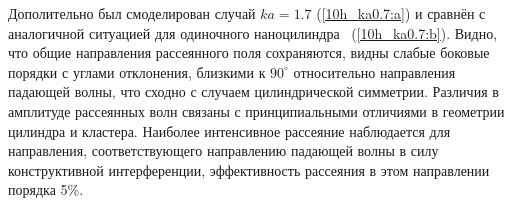 Дополительно был смоделирован случай $ka = 1.7$ (\autoref{10h_ka0.7:a}) и сравнён с аналогичной ситуацией для одиночного наноцилиндра~\cite{andreev_lecz} (\autoref{10h_ka0.7:b}). Видно, что общие направления рассеянного поля сохраняются, видны слабые боковые порядки с углами отклонения, близкими к $90^\circ$ относительно направления падающей волны, что сходно с случаем цилиндрической симметрии. Различия в амплитуде рассеянных волн связаны с принципиальными отличиями в геометрии цилиндра и кластера. Наиболее интенсивное рассеяние наблюдается для направления, соответствующего направлению падающей волны в силу конструктивной интерференции, эффективность рассеяния в этом направлении порядка 5\%.